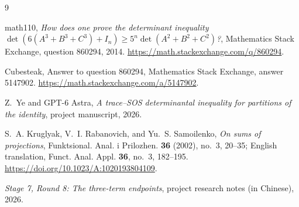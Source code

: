 \documentclass[11pt]{article}
\begin{document}
\begin{thebibliography}{9}

math110,
\emph{How does one prove the determinant inequality
\(\det(6(A^3+B^3+C^3)+I_n)\ge5^n\det(A^2+B^2+C^2)\)?},
Mathematics Stack Exchange, question 860294, 2014.
\url{https://math.stackexchange.com/q/860294}.

Cubesteak, Answer to question 860294, Mathematics Stack Exchange,
answer 5147902.
\url{https://math.stackexchange.com/a/5147902}.

Z.~Ye and GPT-6 Astra,
\emph{A trace--SOS determinantal inequality for partitions of the identity},
project manuscript, 2026.

S.~A. Kruglyak, V.~I. Rabanovich, and Yu.~S. Samoilenko,
\emph{On sums of projections},
Funktsional. Anal. i Prilozhen. \textbf{36} (2002), no.~3, 20--35;
English translation, Funct. Anal. Appl. \textbf{36}, no.~3, 182--195.
\url{https://doi.org/10.1023/A:1020193804109}.

\emph{Stage 7, Round 8: The three-term endpoints},
project research notes (in Chinese), 2026.

\end{thebibliography}
\end{document}
